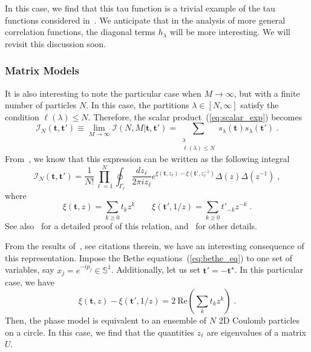 \documentclass[a4paper,11pt]{amsart}
\begin{document}
In this case, we find that this tau function is a trivial example of
the tau functions considered in~\cite{orlov:2001}. We anticipate that
in the analysis of more general correlation functions, the diagonal
terms \(h_\lambda\) will be more interesting. We will revisit this
discussion soon.


\subsubsection{Matrix Models}
It is also interesting to note the particular case when \(M\to
\infty\), but with a finite number of particles \(N\). In this case,
the partitions \(\lambda \in [N, \infty]\) satisfy the condition
\(\ell(\lambda) \leq N\). Therefore, the scalar
product~(\ref{eq:scalar_exp}) becomes
\begin{equation}
  \mathcal{I}_N(\bm{t}, \bm{t}')\equiv 
  \lim_{M\to \infty}\mathcal{I}(N, M|\bm{t}, \bm{t}')
  = \sum_{\substack{\lambda \\ \ell(\lambda) \leq N}} s_\lambda(\bm{t})  s_\lambda(\bm{t}') \; .
\end{equation}
From~\cite{Zabrodin:2010ii}, we know that this expression can be
written as the following integral
\begin{equation}
  \mathcal{I}_N(\bm{t}, \bm{t}') =
  \frac{1}{N!} \prod_{\ell=1}^N \oint_{\Gamma_\ell} \frac{dz_\ell}{2 \pi i z_\ell}
  e^{\xi(\bm{t}, z_\ell) - \xi(\bm{t}', z_{\ell}^{-1})} \Delta(z)\Delta(z^{-1})\; ,
\end{equation}
where
\begin{equation}
\xi(\bm{t}, z) = \sum_{k\geq 0} t_k z^k \qquad
\xi(\bm{t}', 1/z) = \sum_{k\geq 0} t'_{-k} z^{-k} \; . 
\end{equation}
See also~\cite{Kharchev:1991gd} for a detailed proof of this relation,
and~\cite{Orlov:2005} for other details. 

From the results of~\cite{Zabrodin:2010ii}, see citations therein, we
have an interesting consequence of this representation. Impose the
Bethe equations~(\ref{eq:bethe_eq}) to one set of variables, say \(x_j
= e^{-ip_j} \in \mathbb{S}^1\). Additionally, let us set \(\bm{t}' = -
\bm{t}^\star\). In this particular case, we have
\begin{equation}
\xi(\bm{t}, z) - \xi(\bm{t}', 1/z)  = 2 \ \textrm{Re}\left(\sum_k t_k z^k\right)\; .
\end{equation}
Then, the phase model is equivalent to an ensemble of \(N\) 2D Coulomb
particles on a circle. In this case, we find that the quantities
\(z_{\ell}\) are eigenvalues of a matrix \(U\).
\end{document}

